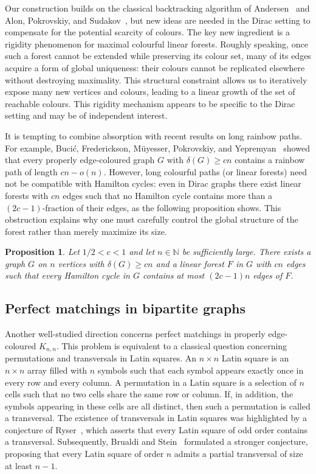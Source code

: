 \documentclass[11pt,reqno]{amsart}
\newtheorem{proposition}[theorem]{Proposition}
\theoremstyle{definition}
\theoremstyle{remark}
\renewcommand\ge{\geqslant}
\begin{document}
Our construction builds on the classical backtracking algorithm of
Andersen~\cite{A} and Alon, Pokrovskiy, and Sudakov~\cite{APS}, but new ideas
are needed in the Dirac setting to compensate for the potential scarcity of
colours.
The key new ingredient is a rigidity phenomenon for maximal colourful
linear forests. Roughly speaking, once such a forest cannot be extended while preserving
its colour set, many of its edges acquire a form of global uniqueness:
their colours cannot be replicated elsewhere without destroying maximality.
This structural constraint allows us to iteratively expose many new
vertices and colours, leading to a linear growth of the set of reachable
colours.
This rigidity mechanism appears to be specific to the Dirac setting and may be of independent interest.


It is tempting to combine absorption with recent results on long rainbow paths.
For example, Buci\'c, Frederickson, M\"uyesser, Pokrovskiy, and Yepremyan~\cite{BFMPY}
showed that every properly edge-coloured graph $G$ with $\delta(G)\ge cn$ contains a rainbow
path of length $cn-o(n)$. However, long colourful paths (or linear forests) need not be compatible with Hamilton
cycles: even in Dirac graphs there exist linear forests with $cn$ edges such that no
Hamilton cycle contains more than a $(2c-1)$-fraction of their edges, as the following proposition shows. This obstruction explains why one must carefully control the global structure of the forest rather than merely maximize its size.

\begin{proposition}\label{Prop:construction}
Let $1/2 < c < 1$ and let $n \in \mathbb{N}$ be sufficiently large. There exists a graph $G$ on $n$ vertices with $\delta(G) \ge cn$ and a linear forest $F$ in $G$ with $cn$ edges such that every Hamilton cycle in $G$ contains at most $(2c - 1)n$ edges of $F$.
\end{proposition}

\subsection{Perfect matchings in bipartite graphs}

Another well-studied direction concerns perfect matchings in properly edge-coloured $K_{n,n}$.
This problem is equivalent to a classical question concerning permutations and transversals in Latin squares.
An $n \times n$ Latin square is an $n \times n$ array filled with $n$ symbols such that each symbol appears exactly once in every row and every column.
A permutation in a Latin square is a selection of $n$ cells such that no two cells share the same row or column.
If, in addition, the symbols appearing in these cells are all distinct, then such a permutation is called a transversal.
The existence of transversals in Latin squares was highlighted by a conjecture of Ryser~\cite{Ryser}, which asserts that every Latin square of odd order contains a transversal.
Subsequently, Brualdi and Stein~\cite{BR,Stein} formulated a stronger conjecture, proposing that every Latin square of order $n$ admits a partial transversal of size at least $n-1$.
\end{document}
